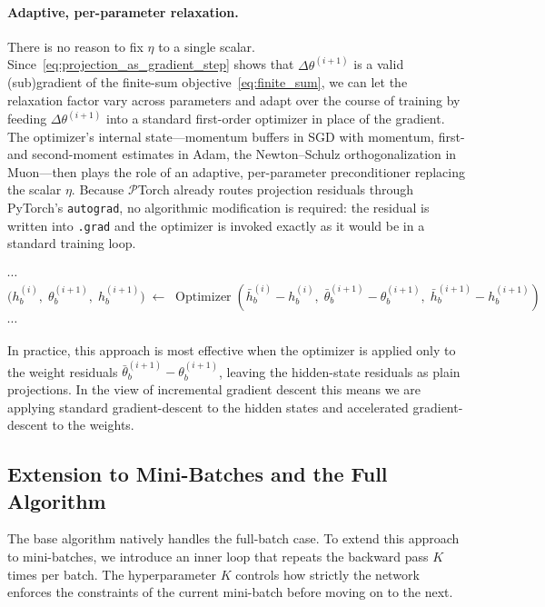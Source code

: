\documentclass{article}
\theoremstyle{plain}
\theoremstyle{definition}
\theoremstyle{remark}
\begin{document}
\paragraph{Adaptive, per-parameter relaxation.}
There is no reason to fix $\eta$ to a single scalar. Since~\eqref{eq:projection_as_gradient_step} shows that $\Delta\theta^{(i+1)}$ is a valid (sub)gradient of the finite-sum objective~\eqref{eq:finite_sum}, we can let the relaxation factor vary across parameters and adapt over the course of training by feeding $\Delta\theta^{(i+1)}$ into a standard first-order optimizer in place of the gradient. The optimizer's internal state---momentum buffers in SGD with momentum, first- and second-moment estimates in Adam, the Newton--Schulz orthogonalization in Muon---then plays the role of an adaptive, per-parameter preconditioner replacing the scalar $\eta$. Because $\mathcal{P}$Torch already routes projection residuals through PyTorch's \texttt{autograd}, no algorithmic modification is required: the residual is written into \texttt{.grad} and the optimizer is invoked exactly as it would be in a standard training loop.

\begin{algorithm}[ht]
    \begin{algorithmic}[1]
        \State $\cdots$
        \State $\bigl(h^{(i)}_b,\;\theta^{(i+1)}_b,\;h^{(i+1)}_b\bigr)
            \;\gets\;
            \operatorname{Optimizer}\!\left(
                \bar{h}^{(i)}_b - h^{(i)}_b,\;
                \bar{\theta}^{(i+1)}_b - \theta^{(i+1)}_b,\;
                \bar{h}^{(i+1)}_b - h^{(i+1)}_b
            \right)$
        \State $\cdots$
    \end{algorithmic}
\end{algorithm}
In practice, this approach is most effective when the optimizer is applied only to the weight residuals $\bar{\theta}^{(i+1)}_b - \theta^{(i+1)}_b$, leaving the hidden-state residuals as plain projections. In the view of incremental gradient descent this means we are applying standard  gradient-descent to the hidden states and accelerated gradient-descent to the weights. 
\subsection{Extension to Mini-Batches and the Full Algorithm}

The base algorithm natively handles the full-batch case. To extend this approach to mini-batches, we introduce an inner loop that repeats the backward pass $K$ times per batch. The hyperparameter $K$ controls how strictly the network enforces the constraints of the current mini-batch before moving on to the next.
\end{document}
